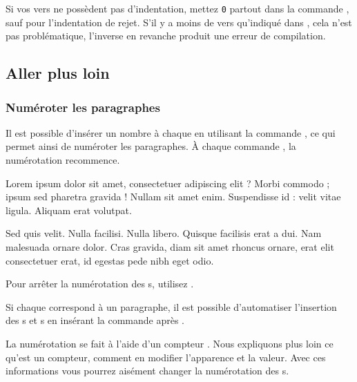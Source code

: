 Si vos vers ne possèdent pas d'indentation, mettez \verb=0= partout dans la commande , sauf pour l'indentation de rejet. S'il y a moins de vers qu'indiqué dans , cela n'est pas problématique, l'inverse en revanche produit une erreur de compilation.



\subsection{Aller plus loin}

\subsubsection{Numéroter les paragraphes}

Il est possible d'insérer un nombre à chaque  en utilisant la commande \label{numberpstarttrue}, ce qui permet ainsi de numéroter les paragraphes. À chaque commande , la numérotation recommence.

\begin{minipage}{0.8\textwidth}
\numberpstarttrue
\beginnumbering
\pstart 
Lorem ipsum dolor sit amet, consectetuer adipiscing elit ?
Morbi commodo ; ipsum sed pharetra gravida !
Nullam sit amet enim. Suspendisse id : velit vitae ligula. 
Aliquam erat volutpat. \pend


\pstart Sed quis velit. Nulla facilisi. Nulla libero. 
 Quisque facilisis erat a dui.
Nam malesuada ornare dolor.
Cras gravida, diam sit amet rhoncus ornare, 
erat  elit consectetuer erat, id egestas pede nibh eget odio.
\pend
\endnumbering
\end{minipage}

Pour arrêter la numérotation des s,  utilisez  .

\begin{plusloins}
Si chaque  correspond à un paragraphe, il est possible d'automatiser l'insertion des s et s en insérant la commande  après .
\end{plusloins}

\begin{plusloins}
La numérotation se fait à l'aide d'un compteur . Nous expliquons plus loin ce qu'est un compteur, comment en modifier l'apparence et la valeur. Avec ces informations vous pourrez aisément changer la numérotation des s.
\end{plusloins}

